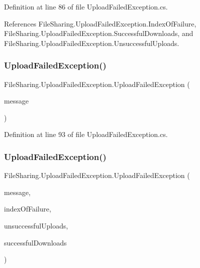 Definition at line 86 of file Upload\+Failed\+Exception.\+cs.



References File\+Sharing.\+Upload\+Failed\+Exception.\+Index\+Of\+Failure, File\+Sharing.\+Upload\+Failed\+Exception.\+Successful\+Downloads, and File\+Sharing.\+Upload\+Failed\+Exception.\+Unsuccessful\+Uploads.

\mbox{\label{class_file_sharing_1_1_upload_failed_exception_a9100bff30f30fc075d688f652b69c70e}} 
\subsubsection{\texorpdfstring{Upload\+Failed\+Exception()}{UploadFailedException()}\hspace{0.1cm}{\footnotesize\ttfamily [3/7]}}
{\footnotesize\ttfamily File\+Sharing.\+Upload\+Failed\+Exception.\+Upload\+Failed\+Exception (\begin{DoxyParamCaption}\item[{string}]{message }\end{DoxyParamCaption})}



Definition at line 93 of file Upload\+Failed\+Exception.\+cs.

\mbox{\label{class_file_sharing_1_1_upload_failed_exception_aae92894e90378d6f003a25c218285a22}} 
\subsubsection{\texorpdfstring{Upload\+Failed\+Exception()}{UploadFailedException()}\hspace{0.1cm}{\footnotesize\ttfamily [4/7]}}
{\footnotesize\ttfamily File\+Sharing.\+Upload\+Failed\+Exception.\+Upload\+Failed\+Exception (\begin{DoxyParamCaption}\item[{string}]{message,  }\item[{int}]{index\+Of\+Failure,  }\item[{I\+Enumerable$<$ Byte\mbox{[}$\,$\mbox{]}$>$}]{unsuccessful\+Uploads,  }\item[{I\+Enumerable$<$ string $>$}]{successful\+Downloads }\end{DoxyParamCaption})}



